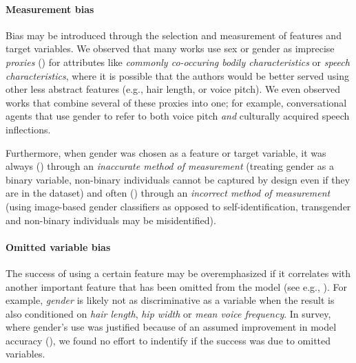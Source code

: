 \documentclass[nonacm,sigconf,review,balance=false]{acmart}
\begin{document}
\paragraph*{Measurement bias} Bias may be introduced through the selection and measurement of features and target variables. 
We observed that many works use sex or gender as imprecise \emph{proxies} (\var) for attributes like \emph{commonly co-occuring bodily characteristics} or \emph{speech characteristics}, where it is possible that the authors would be better served using other less abstract features (e.g., hair length, or voice pitch). We even observed works that combine several of these proxies into one; for example,
conversational agents that use gender to refer to both voice pitch \emph{and} culturally acquired speech inflections.

Furthermore, when gender was chosen as a feature or target variable, it was always (\binary) through an \emph{inaccurate method of measurement} (treating gender as a binary variable, non-binary individuals cannot be captured by design even if they are in the dataset) and often (\classifier) through an \emph{incorrect method of measurement} (using image-based gender classifiers as opposed to self-identification, transgender and non-binary individuals may be misidentified). 

\paragraph*{Omitted variable bias} The success of using a certain feature may be overemphasized if it correlates with another important feature that has been omitted from the model (see e.g., \cite{clarke2005phantom}). For example, \emph{gender} is likely not as discriminative as a variable when the result is also conditioned on \emph{hair length}, \emph{hip width} or \emph{mean voice frequency}. In survey, where gender's use was justified because of an assumed improvement in model accuracy (\var), we found no effort to indentify if the success was due to omitted variables.
\end{document}
